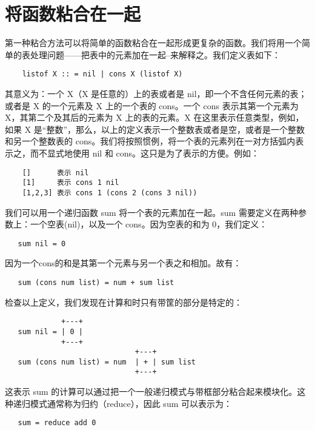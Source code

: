 \documentclass[12pt]{article}
\begin{document}
\section{将函数粘合在一起}

第一种粘合方法可以将简单的函数粘合在一起形成更复杂的函数。我们将用一个简单的表处理问题——把表中的元素加在一起--来解释之。我们定义表如下：

\begin{verbatim}
    listof X :: = nil | cons X (listof X)
\end{verbatim}

其意义为：一个 X（X 是任意的）上的表或者是 nil，即一个不含任何元素的表；或者是 X 的一个元素及 X 上的一个表的 cons。一个 cons 表示其第一个元素为 X，其第二个及其后的元素为 X 上的表的元素。X 在这里表示任意类型，例如，如果 X 是``整数''，那么，以上的定义表示一个整数表或者是空，或者是一个整数和另一个整数表的 cons。我们将按照惯例，将一个表的元素列在一对方括弧内表示之，而不显式地使用 nil 和 cons。这只是为了表示的方便。例如：

\begin{verbatim}
    []      表示 nil
    [1]     表示 cons 1 nil
    [1,2,3] 表示 cons 1 (cons 2 (cons 3 nil))
\end{verbatim}

我们可以用一个递归函数 sum 将一个表的元素加在一起。sum 需要定义在两种参数上：一个空表(nil)，以及一个 cons。因为空表的和为 0，我们定义：

\begin{verbatim}
   sum nil = 0
\end{verbatim}

因为一个cons的和是其第一个元素与另一个表之和相加。故有：

\begin{verbatim}
   sum (cons num list) = num + sum list
\end{verbatim}

检查以上定义，我们发现在计算和时只有带筐的部分是特定的：

\begin{verbatim}
             +---+
   sum nil = | 0 |
             +---+
                              +---+
   sum (cons num list) = num  | + | sum list
                              +---+
\end{verbatim}

这表示 sum 的计算可以通过把一个一般递归模式与带框部分粘合起来模块化。这种递归模式通常称为归约（reduce），因此 sum 可以表示为：

\begin{verbatim}
   sum = reduce add 0
\end{verbatim}
\end{document}

